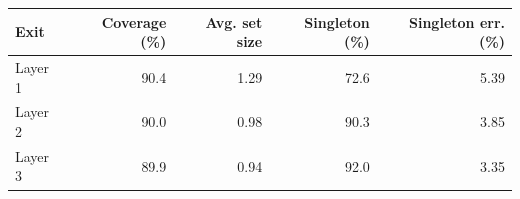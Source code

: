 \begin{tabular}{lrrrr}
\toprule
Exit & Coverage (\%) & Avg. set size & Singleton (\%) & Singleton err. (\%) \\
\midrule
Layer 1 & 90.4 & 1.29 & 72.6 & 5.39 \\
Layer 2 & 90.0 & 0.98 & 90.3 & 3.85 \\
Layer 3 & 89.9 & 0.94 & 92.0 & 3.35 \\
\bottomrule
\end{tabular}
